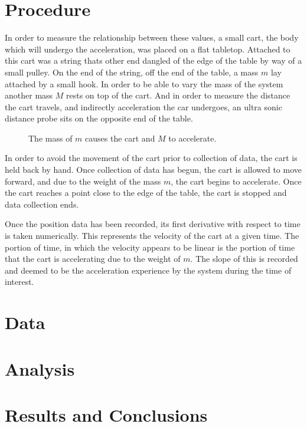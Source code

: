\documentclass[11pt]{article}
\begin{document}
\section{Procedure}
In order to measure the relationship between these values, a small cart, the body which will undergo the acceleration, was placed on a flat tabletop. Attached to this cart was a string thats other end dangled of the edge of the table by way of a small pulley. On the end of the string, off the end of the table, a mass \(m\) lay attached by a small hook. In order to be able to vary the mass of the system another mass \(M\) rests on top of the cart. And in order to measure the distance the cart travels, and indirectly acceleration the car undergoes, an ultra sonic distance probe sits on the opposite end of the table.

\begin{figure}[h]
	\centering
{}
\caption{The mass of \(m\) causes the cart and \(M\) to accelerate. }
\end{figure}

In order to avoid the movement of the cart prior to collection of data, the cart is held back by hand. Once collection of data has begun, the cart is allowed to move forward, and due to the weight of the mass \(m\), the cart begins to accelerate. Once the cart reaches a point close to the edge of the table, the cart is stopped and data collection ends.

Once the position data has been recorded, its first derivative with respect to time is taken numerically. This represents the velocity of the cart at a given time. The portion of time, in which the velocity appears to be linear is the portion of time that the cart is accelerating due to the weight of \(m\). The slope of this is recorded and deemed to be the acceleration experience by the system during the time of interest.

\section{Data}
\section{Analysis}
\section{Results and Conclusions}
\end{document}
